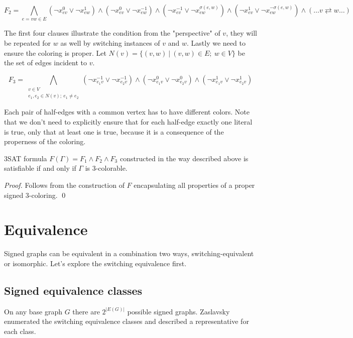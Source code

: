 $$F_2 = \bigwedge _{e = vw \in E} (\neg x^{0}_{ev} \vee \neg x^{1}_{ew}) \wedge (\neg x^{0}_{ev} \vee \neg x^{-1}_{ew}) \wedge (\neg x^{-1}_{ev} \lor \neg x^{\sigma (e, w)}_{ew}) \land (\neg x^{1}_{ev} \lor \neg x^{-\sigma (e, w)}_{ew}) \wedge (\dots v \rightleftarrows w \dots) $$

The first four clauses illustrate the condition from the "perspective" of $v$, they will be repeated for $w$ as well by switching instances of $v$ and $w$. Lastly we need to ensure the coloring is proper. Let $N(v) = \{(v, w) ~|~ (v,w) \in E; ~ w \in V \}$ be the set of edges incident to $v$.

$$F_3 = \bigwedge _{\substack{v \in V \\ e_1, e_2 \in N(v); ~ e_1 \neq e_2}} (\neg x^{-1}_{e_1v} \lor \neg x^{-1}_{e_2v}) \land (\neg x^{0}_{e_1v} \lor \neg x^{0}_{e_2v}) \land (\neg x^{1}_{e_1v} \lor \neg x^{1}_{e_2v}) $$

Each pair of half-edges with a common vertex has to have different colors. Note that we don't need to explicitly ensure that for each half-edge exactly one literal is true, only that at least one is true, because it is a consequence of the properness of the coloring.

\begin{theorem}
    3SAT formula $F(\Gamma) = F_1 \wedge F_2 \wedge F_3$ constructed in the way described above is satisfiable if and only if $\Gamma$ is 3-colorable.
\end{theorem}

\textit{Proof.} Follows from the construction of $F$ encapsulating all properties of a proper signed 3-coloring. \qed

\section{Equivalence}

Signed graphs can be equivalent in a combination two ways, switching-equivalent or isomorphic. Let's explore the switching equivalence first.

\subsection{Signed equivalence classes}

On any base graph $G$ there are $2^{|E(G)|}$ possible signed graphs. Zaslavsky\cite{zaslavsky-graphs} enumerated the switching equivalence classes and described a representative for each class.


